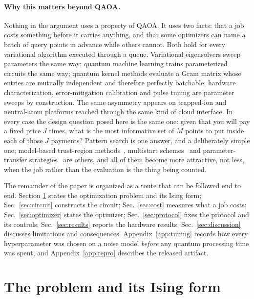 \documentclass[aps,prx,preprint,superscriptaddress,nofootinbib,longbibliography]{revtex4-2}
\begin{document}
\paragraph*{Why this matters beyond QAOA.}
Nothing in the argument uses a property of QAOA. It uses two facts: that a job costs
something before it carries anything, and that some optimizers can name a batch of query
points in advance while others cannot. Both hold for every variational algorithm executed
through a queue. Variational eigensolvers sweep parameters the same way; quantum machine
learning trains parameterized circuits the same way; quantum kernel methods evaluate a Gram
matrix whose entries are mutually independent and therefore perfectly batchable; hardware
characterization, error-mitigation calibration and pulse tuning are parameter sweeps by
construction. The same asymmetry appears on trapped-ion and neutral-atom platforms reached
through the same kind of cloud interface. In every case the design question posed here is the
same one: given that you will pay a fixed price $J$ times, what is the most informative set
of $M$ points to put inside each of those $J$ payments? Pattern search is one answer, and a
deliberately simple one; model-based trust-region methods~\cite{sung2020models}, multistart
schemes~\cite{shaydulin2019multistart} and parameter-transfer
strategies~\cite{akshay2021concentration,galda2021transfer,sureshbabu2024parameter} are
others, and all of them become more attractive, not less, when the job rather than the
evaluation is the thing being counted.

The remainder of the paper is organized as a route that can be followed end to end. Section
\ref{sec:problem} states the optimization problem and its Ising form; Sec.~\ref{sec:circuit}
constructs the circuit; Sec.~\ref{sec:cost} measures what a job costs;
Sec.~\ref{sec:optimizer} states the optimizer; Sec.~\ref{sec:protocol} fixes the protocol and
its controls; Sec.~\ref{sec:results} reports the hardware results;
Sec.~\ref{sec:discussion} discusses limitations and consequences. Appendix~\ref{app:tuning}
records how every hyperparameter was chosen on a noise model \emph{before} any quantum
processing time was spent, and Appendix~\ref{app:repro} describes the released artifact.

\section{The problem and its Ising form}
\label{sec:problem}
\end{document}
